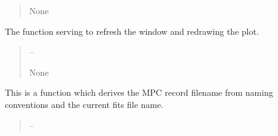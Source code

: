 \documentclass[letterpaper,11pt,english]{sphinxmanual}
\begin{document}
\begin{savenotes}
\begin{fulllineitems}
\begin{savenotes}
\begin{fulllineitems}
\begin{quote}
\begin{description}
\sphinxAtStartPar
None

\end{description}\end{quote}

\end{fulllineitems}\end{savenotes}


\begin{savenotes}\begin{fulllineitems}
\label{\detokenize{code/opihiexarata.gui.manual:opihiexarata.gui.manual.OpihiManualWindow.__connect_push_button_refresh_window}}
\pysigstartsignatures
{}
\pysigstopsignatures
\sphinxAtStartPar
The function serving to refresh the window and redrawing the plot.
\begin{quote}\begin{description}
\sphinxAtStartPar
{} – 

\sphinxAtStartPar
None

\end{description}\end{quote}

\end{fulllineitems}\end{savenotes}


\begin{savenotes}\begin{fulllineitems}
\label{\detokenize{code/opihiexarata.gui.manual:opihiexarata.gui.manual.OpihiManualWindow.__get_mpc_record_filename}}
\pysigstartsignatures
{}
\pysigstopsignatures
\sphinxAtStartPar
This is a function which derives the MPC record filename from
naming conventions and the current fits file name.
\begin{quote}\begin{description}
\sphinxAtStartPar
{} – 


\end{description}
\end{quote}
\end{fulllineitems}
\end{savenotes}
\end{fulllineitems}
\end{savenotes}
\end{document}
